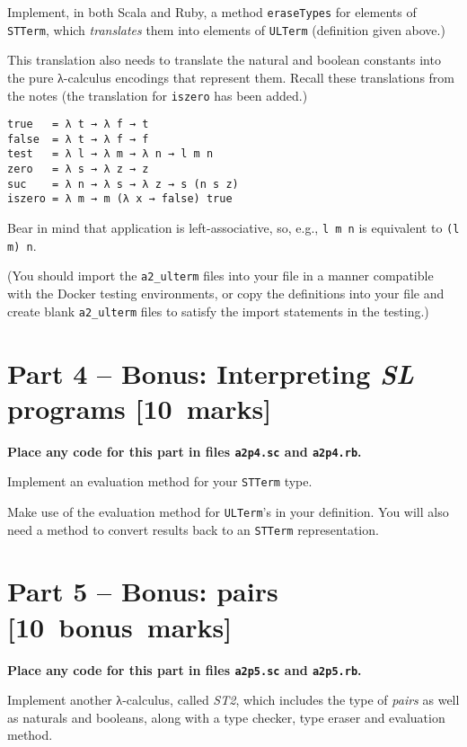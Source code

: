 \documentclass[11pt]{article}
\theoremstyle{definition}
\begin{document}
Implement, in both Scala and Ruby,
a method \texttt{eraseTypes} for elements of \texttt{STTerm},
which \emph{translates} them into elements of \texttt{ULTerm} (definition given above.)

This translation also needs to translate the natural and boolean constants
into the pure λ-calculus encodings that represent them.
Recall these translations from the notes (the translation for \texttt{iszero} has been added.)
\begin{verbatim}
true   = λ t → λ f → t
false  = λ t → λ f → f
test   = λ l → λ m → λ n → l m n
zero   = λ s → λ z → z
suc    = λ n → λ s → λ z → s (n s z)
iszero = λ m → m (λ x → false) true     
\end{verbatim}
Bear in mind that application is left-associative, so, e.g., \texttt{l m n} is
equivalent to \texttt{(l m) n}.

(You should import the \texttt{a2\_ulterm} files into your file
in a manner compatible with the Docker testing environments,
or copy the definitions into your file and create
blank \texttt{a2\_ulterm} files to satisfy the import statements in the testing.)

\section*{Part 4 – Bonus: Interpreting \emph{SL} programs                     [10 marks]}
\label{sec:orgf4fc4d0}
\begin{center}
\textbf{Place any code for this part in files \texttt{a2p4.sc} and \texttt{a2p4.rb}.}
\end{center}

Implement an evaluation method for your \texttt{STTerm} type.

Make use of the evaluation method for \texttt{ULTerm}'s in your definition.
You will also need a method to convert results back
to an \texttt{STTerm} representation.

\section*{Part 5 – Bonus: pairs                                        [10 bonus marks]}
\label{sec:orgfebb5da}
\begin{center}
\textbf{Place any code for this part in files \texttt{a2p5.sc} and \texttt{a2p5.rb}.}
\end{center}

Implement another λ-calculus, called \emph{ST2}, which includes
the type of \emph{pairs} as well as naturals and booleans,
along with a type checker, type eraser and evaluation method.
\end{document}
